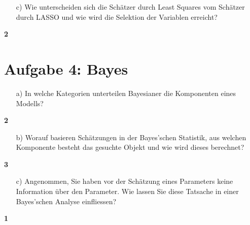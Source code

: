 \documentclass{scrartcl}
\newcommand{\points}[1]
{\begin{flushright}\textbf{#1}\end{flushright}}
\begin{document}
\clearpage
\pagebreak

\begin{enumerate}
\item[c)] Wie unterscheiden sich die Sch\"atzer durch Least Squares vom Sch\"atzer durch LASSO und wie wird die Selektion der Variablen erreicht?
\end{enumerate}
\points{2}



\clearpage
\pagebreak

\section*{Aufgabe 4: Bayes}

\begin{enumerate}
\item[a)] In welche Kategorien unterteilen Bayesianer die Komponenten eines Modells?
\end{enumerate}
\points{2}


\clearpage
\pagebreak

\begin{enumerate}
\item[b)] Worauf basieren Sch\"atzungen in der Bayes'schen Statistik, aus welchen Komponente besteht das gesuchte Objekt und wie wird dieses berechnet?
\end{enumerate}
\points{3}

\clearpage
\pagebreak

\begin{enumerate}
\item[c)] Angenommen, Sie haben vor der Sch\"atzung eines Parameters keine Information \"uber den Parameter. Wie lassen Sie diese Tatsache in einer Bayes'schen Analyse einfliessen?
\end{enumerate}
\points{1}
\end{document}
